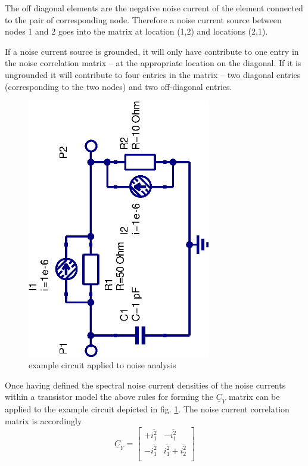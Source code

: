 \documentclass[10pt]{report}
\begin{document}
\addvspace{12pt}

The off diagonal elements are the negative noise current of the
element connected to the pair of corresponding node.  Therefore a
noise current source between nodes 1 and 2 goes into the matrix at
location (1,2) and locations (2,1).

\addvspace{12pt}

If a noise current source is grounded, it will only have contribute to
one entry in the noise correlation matrix -- at the appropriate
location on the diagonal.  If it is ungrounded it will contribute to
four entries in the matrix -- two diagonal entries (corresponding to
the two nodes) and two off-diagonal entries.

\begin{figure}[ht]
\begin{center}
\includegraphics[angle=-90,width=8cm]{CYexample}
\end{center}
\caption{example circuit applied to noise analysis}
\label{fig:CYexample}
\end{figure}
\FloatBarrier

Once having defined the spectral noise current densities of the noise
currents within a transistor model the above rules for forming the
$\underline{C}_Y$ matrix can be applied to the example circuit
depicted in fig. \ref{fig:CYexample}.  The noise current
correlation matrix is accordingly
\begin{equation}
\underline{C}_Y =
\begin{bmatrix}
+\overline{i_1^2} & -\overline{i_1^2}\\
-\overline{i_1^2} & \overline{i_1^2} + \overline{i_2^2}\\
\end{bmatrix}
\end{equation}
\end{document}
